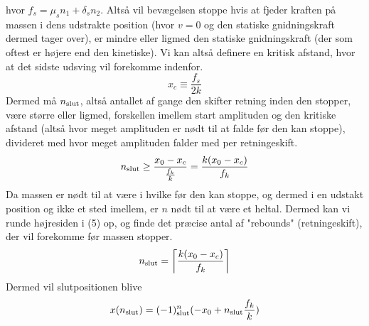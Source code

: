 hvor $f_s = \mu_s n_1 + \delta_s n_2$. Altså vil bevægelsen stoppe hvis at fjeder kraften på massen i dens udstrakte position (hvor $v = 0$ og den statiske gnidningskraft dermed tager over), 
er mindre eller ligmed den statiske gnidningskraft (der som oftest er højere end den kinetiske). Vi kan altså definere en kritisk afstand, hvor at det sidste udsving vil forekomme indenfor.
\begin{equation}
    x_c \equiv \frac{f_s}{2k}
\end{equation}
Dermed må $n_{\textup{slut}}$, altså antallet af gange den skifter retning inden den stopper, 
være større eller ligmed, forskellen imellem start amplituden og den kritiske afstand (altså hvor meget amplituden er nødt til at falde før den kan stoppe), divideret med hvor meget amplituden falder med per retningeskift.
\begin{equation}
    n_{\textup{slut}} \geq \frac{x_0 - x_c}{\frac{f_k}{k}} = \frac{k(x_0 - x_c)}{f_k}
\end{equation}
Da massen er nødt til at være i hvilke før den kan stoppe, og dermed i en udstakt position og ikke et sted imellem, er $n$ nødt til at være et heltal. 
Dermed kan vi runde højresiden i (5) op, og finde det præcise antal af "rebounds" (retningeskift), der vil forekomme før massen stopper.
\begin{equation}
    n_{\textup{slut}} = \left \lceil \frac{k(x_0 - x_c)}{f_k} \right \rceil
\end{equation}
Dermed vil slutpositionen blive
\begin{equation}
    x(n_{\textup{slut}}) = (-1)^n_{\textup{slut}} (-x_0 + n_{\textup{slut}} \frac{f_k}{k})
\end{equation}